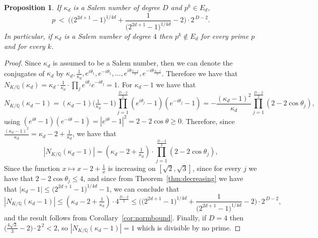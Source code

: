 \documentclass{article}
\theoremstyle{plain}
\newtheorem{proposition}[theorem]{Proposition}
\theoremstyle{definition}
\theoremstyle{remark}
\begin{document}
\begin{proposition}\label{prop:salem}
If $\kappa_d$ is a Salem number of degree $D$ and $p^k \in E_d$,
\[
p\ <\ \Bigg( \big(2^{2d+1}-1\big)^{1/4d} + \frac{1}{\big(2^{2d+1}-1\big)^{1/4d}} -2\Bigg)\cdot2^{\,D-2}.
\]
In particular, if $\kappa_d$ is a Salem number of degree $4$ then $p^k \notin E_d$ for every prime $p$ and for every $k$.
\end{proposition}

\begin{proof}
Since $\kappa_d$ is assumed to be a Salem number, then we can denote the conjugates of $\kappa_d$ by $\kappa_d, \frac{1}{\kappa_d}, e^{i\theta_1}, e^{-i\theta_1}, \dots, e^{i\theta_{\frac{D-2}{2}}}, e^{-i\theta_{\frac{D-2}{2}}}$. Therefore we have that $N_{K/\mathbb Q}(\kappa_d)=\kappa_d\cdot\tfrac1{\kappa_d}\cdot\prod_je^{i\theta_j}e^{-i\theta_j}=1$. For $\kappa_d-1$ we have that 
\[
N_{K/\mathbb Q}(\kappa_d-1)=(\kappa_d-1)\Big(\tfrac1{\kappa_d}-1\Big)\prod_{j=1}^{\frac{D-2}{2}}
(e^{i\theta_j}-1)(e^{-i\theta_j}-1) = -\frac{(\kappa_d-1)^2}{\kappa_d}
\prod_{j=1}^{\frac{D-2}{2}}(2-2\cos\theta_j),
\]
using $(e^{i\theta}-1)(e^{-i\theta}-1)=|e^{i\theta}-1|^2=2-2\cos\theta\ge0$. Therefore, since $\frac{(\kappa_d-1)^2}{\kappa_d}=\kappa_d-2+\tfrac1{\kappa_d}$, we have that 
\[
|N_{K/\mathbb Q}(\kappa_d-1)| = \left(\kappa_d-2+\tfrac1{\kappa_d}\right)\cdot \prod_{j=1}^{\frac{D-2}{2}}(2-2\cos\theta_j),
\]
Since the function $x \mapsto x-2+\frac{1}{x}$ is increasing on $[\sqrt2,\sqrt3]$, since for every $j$ we have that $2-2\cos\theta_j\le4$, and since from Theorem~\ref{thm:decreasing} we have that $|\kappa_d-1|\le \big(2^{2d+1}-1\big)^{1/4d}-1$, we can conclude that
\[
|N_{K/\mathbb Q}(\kappa_d-1)| \le \left(\kappa_d-2+\tfrac1{\kappa_d}\right)\cdot4^{\frac{D-2}{2}} \leq 
\Bigg( \big(2^{2d+1}-1\big)^{1/4d} + \frac{1}{\big(2^{2d+1}-1\big)^{1/4d}} -2\Bigg)\cdot2^{\,D-2},
\]
and the result follows from Corollary~\ref{cor:normbound}. Finally, if $D=4$ then $\Big(\tfrac{4\sqrt3}3-2\Big)\cdot2^{\,2} <2$, so $|N_{K/\mathbb Q}(\kappa_d-1)|=1$ which is divisible by no prime.
\end{proof}

 
\end{document}
